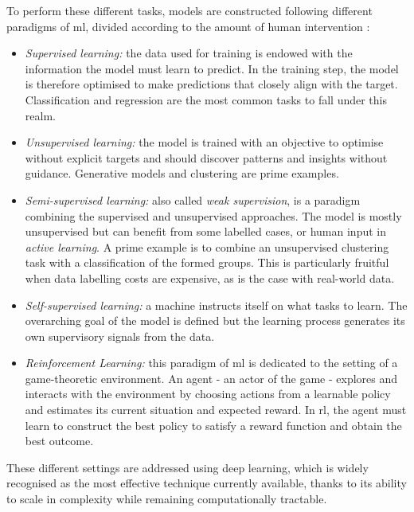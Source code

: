 To perform these different tasks, models are constructed following different paradigms of \gls{ml}, divided according to the amount of human intervention \cite{MurphyML}:
\begin{itemize}
    \item \textit{Supervised learning:} the data used for training is endowed with the information the model must learn to predict. In the training step, the model is therefore optimised to make predictions that closely align with the target. Classification and regression are the most common tasks to fall under this realm.
    \item \textit{Unsupervised learning:} the model is trained with an objective to optimise without explicit targets and should discover patterns and insights without guidance. Generative models and clustering are prime examples. 
    \item \textit{Semi-supervised learning:} also called \textit{weak supervision}, is a paradigm combining the supervised and unsupervised approaches. The model is mostly unsupervised but can benefit from some labelled cases, or human input in \textit{active learning}. A prime example is to combine an unsupervised clustering task with a classification of the formed groups. This is particularly fruitful when data labelling costs are expensive, as is the case with real-world data.
    \item \textit{Self-supervised learning:} a machine instructs itself on what tasks to learn. The overarching goal of the model is defined but the learning process generates its own supervisory signals from the data.
    \item \textit{Reinforcement Learning:} this paradigm of \gls{ml} is dedicated to the setting of a game-theoretic environment. An agent - an actor of the game - explores and interacts with the environment by choosing actions from a learnable policy and estimates its current situation and expected reward. In \gls{rl}, the agent must learn to construct the best policy to satisfy a reward function and obtain the best outcome.
\end{itemize}
These different settings are addressed using deep learning, which is widely recognised as the most effective technique currently available, thanks to its ability to scale in complexity while remaining computationally tractable.

